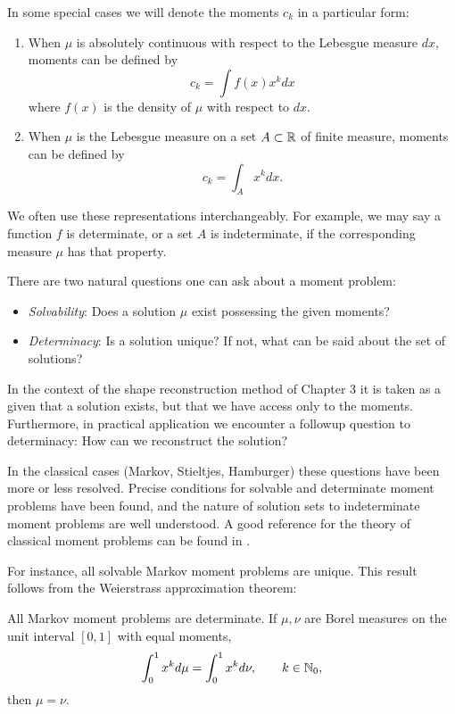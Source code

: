 In some special cases we will denote the moments $c_k$ in a particular form:
\begin{enumerate}
  \item When $\mu$ is absolutely continuous with respect to the Lebesgue measure $dx$, moments can be defined by
  \[
    c_k = \int f(x)x^k dx
  \]
  where $f(x)$ is the density of $\mu$ with respect to $dx$.
  \item When $\mu$ is the Lebesgue measure on a set $A \subset \mathbb{R}$ of finite measure, moments can be defined by
  \[
    c_k = \int_A x^k dx.
  \]
\end{enumerate}
We often use these representations interchangeably. For example, we may say a function $f$ is determinate, or a set $A$ is indeterminate, if the corresponding measure $\mu$ has that property. 

There are two natural questions one can ask about a moment problem:
\begin{itemize}[label=]
  \item \emph{Solvability}: Does a solution $\mu$ exist possessing the given moments?
  \item \emph{Determinacy}: Is a solution unique? If not, what can be said about the set of solutions?
\end{itemize}

In the context of the shape reconstruction method of Chapter 3 it is taken as a given that a solution exists, but that we have access only to the moments. Furthermore, in practical application we encounter a followup question to determinacy: How can we reconstruct the solution?

In the classical cases (Markov, Stieltjes, Hamburger) these questions have been more or less resolved. Precise conditions for solvable and determinate moment problems have been found, and the nature of solution sets to indeterminate moment problems are well understood. A good reference for the theory of classical moment problems can be found in \cite{A2021}.

For instance, all solvable Markov moment problems are unique. This result follows from the Weierstrass approximation theorem:

\begin{proposition}
  All Markov moment problems are determinate. If $\mu, \nu$ are Borel measures on the unit interval $[0,1]$ with equal moments,
  \[
    \int_0^1 x^k d\mu = \int_0^1 x^k d\nu, \qquad k \in \mathbb{N}_0,
  \]
  then $\mu = \nu$.
\end{proposition}

